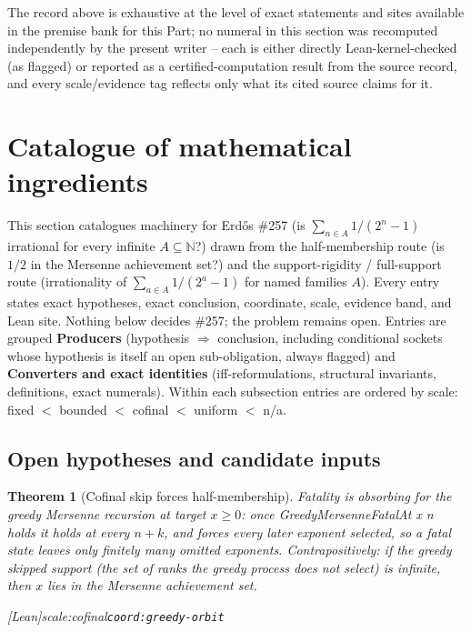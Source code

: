 \documentclass[11pt]{article}
\theoremstyle{plain}
\newtheorem{thm}{Theorem}[section]
\theoremstyle{definition}
\theoremstyle{remark}
\newcommand{\lean}[2]{\leanlink{#2}}
\newcommand{\ev}[1]{{\small\textsf{[#1]}}\xspace}
\newcommand{\scale}[1]{{\small\textsf{scale:#1}}\xspace}
\newcommand{\coord}[1]{\texorpdfstring{{\small\nolinkurl{coord:#1}}}{coord:#1}\xspace}
\begin{document}
The record above is exhaustive at the level of exact statements and sites available in the premise
bank for this Part; no numeral in this section was recomputed independently by the present writer --
each is either directly Lean-kernel-checked (as flagged) or reported as a certified-computation
result from the source record, and every scale/evidence tag reflects only what its cited source
claims for it.
\section{Catalogue of mathematical ingredients}

This section catalogues machinery for Erd\H{o}s \#257 (is $\sum_{n\in A} 1/(2^n-1)$
irrational for every infinite $A\subseteq\mathbb{N}$?) drawn from the half-membership
route (is $1/2$ in the Mersenne achievement set?) and the support-rigidity /
full-support route (irrationality of $\sum_{a\in A} 1/(2^a-1)$ for named families $A$).
Every entry states exact hypotheses, exact conclusion, coordinate, scale, evidence band,
and Lean site. Nothing below decides \#257; the problem remains open. Entries are grouped
\textbf{Producers} (hypothesis $\Rightarrow$ conclusion, including conditional sockets
whose hypothesis is itself an open sub-obligation, always flagged) and \textbf{Converters
and exact identities} (iff-reformulations, structural invariants, definitions, exact
numerals). Within each subsection entries are ordered by scale:
fixed $<$ bounded $<$ cofinal $<$ uniform $<$ n/a.

\subsection{Open hypotheses and candidate inputs}

\begin{thm}[Cofinal skip forces half-membership]
\label{thm:fatal-absorbing}
Fatality is absorbing for the greedy Mersenne recursion at target $x\ge 0$: once
\emph{GreedyMersenneFatalAt x n} holds it holds at every $n+k$, and forces every later
exponent selected, so a fatal state leaves only finitely many omitted exponents.
Contrapositively: if the greedy skipped support (the set of ranks the greedy process
does \emph{not} select) is infinite, then $x$ lies in the Mersenne achievement set.
\par\ev{Lean}\scale{cofinal}\coord{greedy-orbit}
\lean{mem\_mersenneAchievementSet\_of\_greedySkippedSupport\_infinite}{GreedyAchievementSet.lean:1528}
\end{thm}
\end{document}
